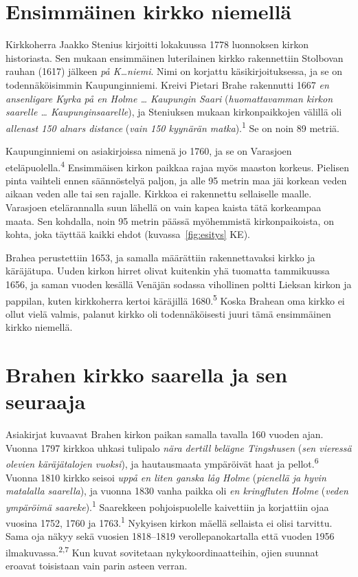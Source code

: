 \documentclass[11pt,a4paper]{article}
\newcommand{\viite}[1]{\textsuperscript{\sffamily\color{leima}#1}}
\newcommand{\sv}[2]{\textit{#1} (\textit{#2})}
\begin{document}
\section{Ensimmäinen kirkko niemellä}

Kirkkoherra Jaakko Stenius kirjoitti lokakuussa 1778 luonnoksen kirkon historiasta. Sen mukaan ensimmäinen luterilainen kirkko rakennettiin Stolbovan rauhan (1617) jälkeen \textit{på K…niemi}. Nimi on korjattu käsikirjoituksessa, ja se on todennäköisimmin Kaupunginniemi. Kreivi Pietari Brahe rakennutti 1667 \sv{en ansenligare Kyrka på en Holme … Kaupungin Saari}{huomattavamman kirkon saarelle … Kaupunginsaarelle}, ja Steniuksen mukaan kirkonpaikkojen välillä oli \sv{allenast 150 alnars distance}{vain 150 kyynärän matka}.\viite{1} Se on noin 89 metriä.

Kaupunginniemi on asiakirjoissa nimenä jo 1760, ja se on Varasjoen eteläpuolella.\viite{4} Ensimmäisen kirkon paikkaa rajaa myös maaston korkeus. Pielisen pinta vaihteli ennen säännöstelyä paljon, ja alle 95 metrin maa jäi korkean veden aikaan veden alle tai sen rajalle. Kirkkoa ei rakennettu sellaiselle maalle. Varasjoen etelärannalla suun lähellä on vain kapea kaista tätä korkeampaa maata. Sen kohdalla, noin 95 metrin päässä myöhemmistä kirkonpaikoista, on kohta, joka täyttää kaikki ehdot (kuvassa~\ref{fig:esitys} KE).

Brahea perustettiin 1653, ja samalla määrättiin rakennettavaksi kirkko ja käräjätupa. Uuden kirkon hirret olivat kuitenkin yhä tuomatta tammikuussa 1656, ja saman vuoden kesällä Venäjän sodassa vihollinen poltti Lieksan kirkon ja pappilan, kuten kirkkoherra kertoi käräjillä 1680.\viite{5} Koska Brahean oma kirkko ei ollut vielä valmis, palanut kirkko oli todennäköisesti juuri tämä ensimmäinen kirkko niemellä.

\section{Brahen kirkko saarella ja sen seuraaja}

Asiakirjat kuvaavat Brahen kirkon paikan samalla tavalla 160 vuoden ajan. Vuonna 1797 kirkkoa uhkasi tulipalo \sv{nära dertill belägne Tingshusen}{sen vieressä olevien käräjätalojen vuoksi}, ja hautausmaata ympäröivät haat ja pellot.\viite{6} Vuonna 1810 kirkko seisoi \sv{uppå en liten ganska låg Holme}{pienellä ja hyvin matalalla saarella}, ja vuonna 1830 vanha paikka oli \sv{en kringfluten Holme}{veden ympäröimä saareke}.\viite{1} Saarekkeen pohjoispuolelle kaivettiin ja korjattiin ojaa vuosina 1752, 1760 ja 1763.\viite{1} Nykyisen kirkon mäellä sellaista ei olisi tarvittu. Sama oja näkyy sekä vuosien 1818--1819 verollepanokartalla että vuoden 1956 ilmakuvassa.\viite{2,7} Kun kuvat sovitetaan nykykoordinaatteihin, ojien suunnat eroavat toisistaan vain parin asteen verran.
\end{document}
